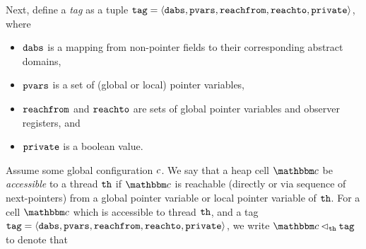 Next, define a {\em tag} as a tuple
$\mathtt{tag} = \left\langle\mathtt{dabs},\mathtt{pvars},\mathtt{reachfrom},\mathtt{reachto},\mathtt{private}\right\rangle$, where
\begin{itemize}
\item
  $\mathtt{dabs}$ is a mapping from non-pointer fields to their corresponding abstract
  domains,
\item
  $\mathtt{pvars}$ is a set of (global or local) pointer variables,
 \item
   $\mathtt{reachfrom}$ and $\mathtt{reachto}$ are sets of global pointer variables and observer registers, and
  \item $\mathtt{private}$ is a boolean value.
\end{itemize}
Assume some global configuration $c$.
We say that a heap cell $\cell$ be {\em accessible} to a thread ${\tt th}$
if $\cell$ is reachable (directly or via sequence of
next-pointers) from a global pointer variable or local pointer
variable of ${\tt th}$.
For a cell $\cell$ which is accessible to thread ${\tt th}$, and a tag
$\mathtt{tag} = \left\langle\mathtt{dabs},\mathtt{pvars},\mathtt{reachfrom},\mathtt{reachto},\mathtt{private}\right\rangle$, we write $\cell \satfrag{\thread} \atag$ to denote that
